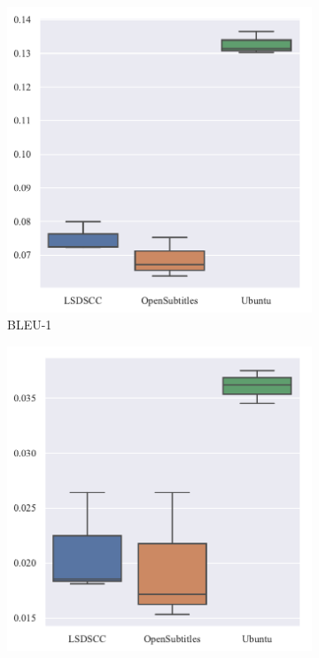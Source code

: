 \begin{figure}[H]
    \begin{subfigure}{0.24\linewidth}
        \centering
        \includegraphics[width=\linewidth]{figure/boxplot/dataset/bleu_1/plot.pdf}
        \caption{BLEU-1}
    \end{subfigure}%
    \begin{subfigure}{0.24\linewidth}
        \centering
        \includegraphics[width=\linewidth]{figure/boxplot/dataset/bleu_2/plot.pdf}

\end{subfigure}
\end{figure}
